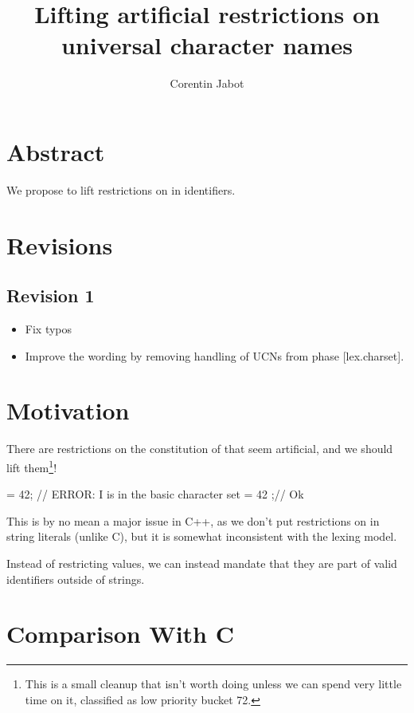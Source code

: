 \documentclass{wg21}
\title{Lifting artificial restrictions on universal character names}
\author{Corentin Jabot}{corentin.jabot@gmail.com}
\begin{document}
\maketitle

\section{Abstract}

We propose to lift restrictions on  in identifiers.


\section{Revisions}

\subsection*{Revision 1}
\begin{itemize}
  \item Fix typos
  \item Improve the wording by removing handling of UCNs from phase [lex.charset].
\end{itemize}

\section {Motivation}

There are restrictions on the constitution of  that seem artificial,
and we should lift them\footnote{This is a small cleanup that isn't worth doing unless we can spend very little time on it,
classified as low priority bucket 72.}!

\begin{colorblock}
 = 42; // ERROR: I is in the basic character set
 = 42 ;// Ok
\end{colorblock}

This is by no mean a major issue in C++, as we don't put restrictions on  in string literals (unlike C),
but it is somewhat inconsistent with the lexing model.

Instead of restricting  values,
we can instead mandate that they are part of valid identifiers outside of strings.

\section{Comparison With C}
\end{document}
